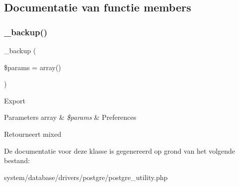 \subsection{Documentatie van functie members}
\mbox{\label{class_c_i___d_b__postgre__utility_a30f3053d2c82e7562349924363507afa}} 
\subsubsection{\texorpdfstring{\_backup()}{\_backup()}}
{\footnotesize\ttfamily \+\_\+backup (\begin{DoxyParamCaption}\item[{}]{\$params = {\ttfamily array()} }\end{DoxyParamCaption})\hspace{0.3cm}{\ttfamily [protected]}}

Export


\begin{DoxyParams}[1]{Parameters}
array & {\em \$params} & Preferences \\
\hline
\end{DoxyParams}
\begin{DoxyReturn}{Retourneert}
mixed 
\end{DoxyReturn}


De documentatie voor deze klasse is gegenereerd op grond van het volgende bestand\+:\begin{DoxyCompactItemize}
\item 
system/database/drivers/postgre/postgre\+\_\+utility.\+php\end{DoxyCompactItemize}
